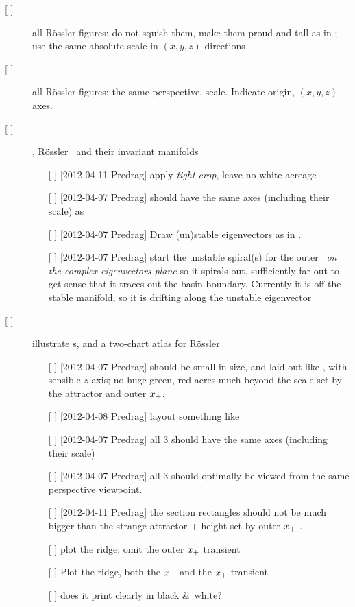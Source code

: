\begin{description}
\item[{[ ]}] all R\"ossler figures: do not squish them, make them proud
        and tall as in ; use the same absolute scale
        in $(x,y,z)$ directions
\item[{[ ]}] all R\"ossler figures: the same perspective, scale. Indicate origin, $(x,y,z)$ axes.
\item[{[ ]}] ,
        R\"ossler \eqva\ and their invariant manifolds
    \begin{itemize}
        \item[{[ ]}] [2012-04-11 Predrag] apply \emph{tight crop}, leave no white acreage
        \item[{[ ]}] [2012-04-07 Predrag] should have the same axes
            (including their scale) as 
        \item[{[ ]}] [2012-04-07 Predrag] Draw (un)stable eigenvectors as
                in .
        \item[{[ ]}] [2012-04-07 Predrag] start the unstable spiral(s)
            for the outer \eqv\ \emph{on the complex eigenvectors plane}
            so it spirals out, sufficiently far out to get sense that it
            traces out the basin boundary. Currently it is off the stable
            manifold, so it is drifting along the unstable eigenvector
    \end{itemize}

\item[{[ ]}]
    illustrate \poincBord s, and a two-chart atlas for R\"ossler
    \begin{itemize}
        \item[{[ ]}] [2012-04-07 Predrag] should be small in size, and laid out like
            , with sensible $z$-axis; no huge green,
            red acres much beyond the scale set by the attractor and
            outer $x_{+}$.
        \item[{[ ]}] [2012-04-08 Predrag] layout something like 
        \item[{[ ]}] [2012-04-07 Predrag] all 3 should have the same axes
            (including their scale)
        \item[{[ ]}] [2012-04-07 Predrag] all 3 should optimally be viewed from the same
            perspective viewpoint.
        \item[{[ ]}] [2012-04-11 Predrag] the section rectangles should
            not be much bigger than the strange attractor + height set by
            outer  $x_{+}$ \eqv.
        \item[{[ ]}]  plot the ridge; omit the
            outer $x_{+}$ transient
        \item[{[ ]}]  Plot
            the ridge, both the $x_{-}$ and the $x_{+}$ transient
        \item[{[ ]}] does it print clearly in black \&\ white?
    \end{itemize}


\end{description}
